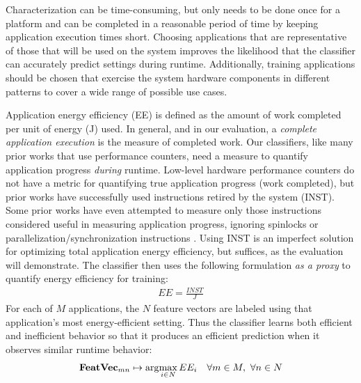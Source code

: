 Characterization can be time-consuming, but only needs to be done once for a platform and can be completed in a reasonable period of time by keeping application execution times short.
Choosing applications that are representative of those that will be used on the system improves the likelihood that the classifier can accurately predict settings during runtime.
Additionally, training applications should be chosen that exercise the system hardware components in different patterns to cover a wide range of possible use cases.

Application energy efficiency (EE) is defined as the amount of work completed per unit of energy (J) used.
In general, and in our evaluation, a \emph{complete application execution} is the measure of completed work. %
Our classifiers, like many prior works that use performance counters, need a measure to quantify application progress \emph{during} runtime.
Low-level hardware performance counters do not have a metric for quantifying true application progress (work completed), but prior works have successfully used instructions retired by the system (INST).
Some prior works have even attempted to measure only those instructions considered useful in measuring application progress, \eg ignoring spinlocks or parallelization/synchronization instructions \cite{Paragon}.
Using INST is an imperfect solution for optimizing total application energy efficiency, but suffices, as the evaluation will demonstrate.
The classifier then uses the following formulation \emph{as a proxy} to quantify energy efficiency for training:
\begin{eqnarray}
EE = \frac{INST}{J}
\label{eqn:ee}
\end{eqnarray}
For each of $M$ applications, the $N$ feature vectors are labeled using that application's most energy-efficient setting.
Thus the classifier learns both efficient and inefficient behavior so that it produces an efficient prediction when it observes similar runtime behavior:
\begin{eqnarray}
\mathbf{FeatVec}_{mn} \mapsto \arg\!\max_{i \in N}EE_i \,\,\,\,\,\,\forall m \in M,\,\,\forall n \in N
\label{eqn:label}
\end{eqnarray}
